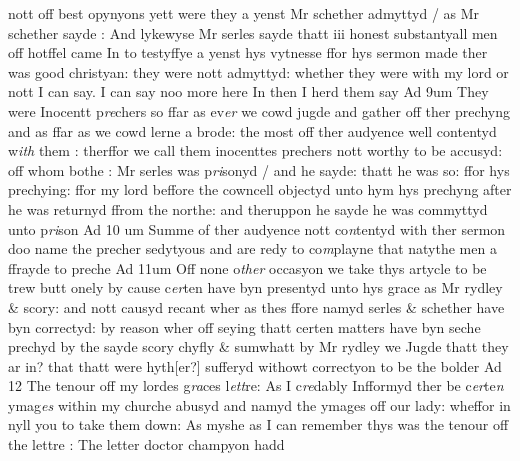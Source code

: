 \documentclass[12pt, a4paper]{book}
\begin{document}
                                        nott off best opynyons yett were they a yenst Mr schether admyttyd / as Mr schether  sayde : And lykewyse Mr serles sayde thatt iii honest substantyall men off hotffel came In to testyffye a yenst hys vytnesse ffor hys sermon made ther was good  christyan: they were nott admyttyd: whether they were with my lord or nott I can  say. I can say noo more here In then I herd them say Ad 9um They were Inocentt p\textit{re}chers so ffar as ev\textit{er} we cowd jugde and gather off ther prechyng and as ffar as we cowd lerne a brode: the most off ther audyence well contentyd w\textit{ith} them : therffor we call them inocenttes prechers nott worthy to be accusyd: off whom bothe : Mr serles was p\textit{ri}sonyd / and he sayde: thatt he was so: ffor hys prechying: ffor my lord beffore the cowncell objectyd unto hym hys prechyng after he was returnyd ffrom the northe: and theruppon he sayde he was commyttyd unto p\textit{ri}son Ad 10 um Summe of ther audyence nott co\textit{n}tentyd with ther sermon doo name the precher sedytyous and are redy to co\textit{m}playne that natythe men a ffrayde to preche Ad 11um Off none o\textit{ther} occasyon we take thys artycle to be trew butt onely by cause c\textit{er}ten have byn presentyd unto hys grace as Mr rydley \& scory: and nott causyd recant wher as thes ffore namyd serles \& schether have byn correctyd: by reason wher off seying thatt certen matters have byn seche prechyd by the sayde scory chyfly \& sumwhatt by Mr rydley we Jugde thatt they ar in? that thatt were hyth[er?] sufferyd withowt correctyon to be the bolder Ad 12  The tenour off my lordes g\textit{ra}ces l\textit{ett}re: As I c\textit{re}dably Infformyd ther be  c\textit{er}te\textit{n} ymag\textit{es} within my churche abusyd and namyd the ymages off our lady: wheffor in nyll you to take them down: As myshe as I  can remember thys was the tenour off the lettre : The letter doctor  champyon hadd   
                                                
                                             
                                          
                                       
                                    
                                 
                              
                           
                        
                     
                  
               
               
\end{document}

